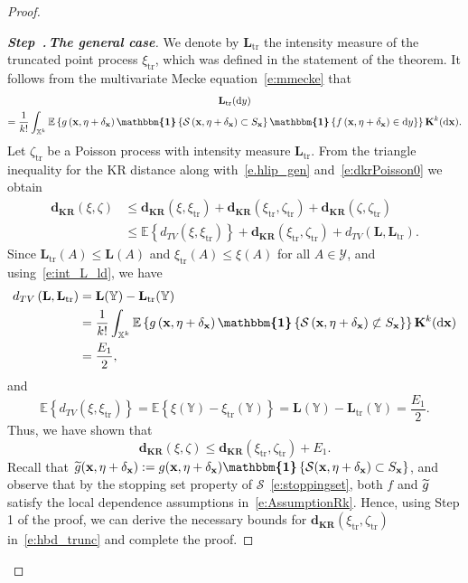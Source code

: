 \documentclass[10pt]{amsart}
\theoremstyle{definition}\newtheorem{defi}[theo]{Definition}\newtheorem{rema}[theo]{Remark}\newtheorem{exam}[theo]{Example}\newtheorem{exem}[theo]{Example}\newtheorem{nota}[theo]{Notation}
\newcommand*\bL{\mathbf{L}}
\newcommand*\bK{\mathbf{K}}
\newcommand{\bx}{\mathbf{x}}
\newcommand*\dkr{\mathbf{d_{KR}}}
\newcommand*\X{\mathbb{X}}
\newcommand*\Y{\mathbb{Y}}
\newcommand{\E}{\mathbb{E}}
\newcommand*\cS{\mathcal{S}}
\newcommand*\cY{\mathcal{Y}}
\newcommand{\tr}{\mathrm{tr}}
\newcommand*\md{\mathrm{d}}
\newcommand{\mean}[1] {\E\left\{{#1}\right\}}
\newcommand{\ind}{\boldsymbol{\mathbbm{1}}}
\newcommand{\set}[1]{\left\{#1\right\}}
\newcommand{\tg}{\tilde{g}}
\newcounter{stepcount}
\newenvironment{step}[1]{\refstepcounter{stepcount}\begin{proof}[\emph{\textbf{Step~\thestepcount.\,}{\textbf{#1}}}]}
{\let\qed\relax\end{proof}}
\let\oldtilde\tilde
\renewcommand*{\tilde}[1]{\mathchoice{\widetilde{#1}}{\widetilde{#1}}{\oldtilde{#1}}{\oldtilde{#1}}}
\begin{document}
\begin{proof}
\begin{step}{{The general case}}
We denote by $\bL_{\tr}$ the intensity measure of the truncated point process $\xi_{\tr}$, which was defined in the statement of the theorem. It follows from the multivariate Mecke equation~\eqref{e:mmecke} that
\begin{multline*}
\bL_{\tr}(\md y) \\
= \frac{1}{k!}\int_{\X^k} \mean{g\left(\bx,\eta+\delta_{\bx}\right) \ind\set{\cS\left(\bx,\eta+\delta_{\bx}\right) \subset S_{\bx}} \ind\set{f\left(\bx,\eta+\delta_{\bx}\right)\in \md y}} \bK^k(\md\bx).
\end{multline*}
Let $\zeta_{\tr}$ be a Poisson process with intensity measure $\bL_{\tr}$. From the triangle inequality for the KR distance along with~\eqref{e.hlip_gen} and~\eqref{e:dkrPoisson0} we obtain
\begin{align*}
\dkr(\xi,\zeta) & \leq \dkr\left(\xi,\xi_{\tr}\right) + \dkr\left(\xi_{\tr},\zeta_{\tr}\right) + \dkr\left(\zeta,\zeta_{\tr}\right) \\
& \leq \mean{d_{TV}\left(\xi,\xi_{\tr}\right)} + \dkr\left(\xi_{\tr},\zeta_{\tr}\right) + d_{TV}\left(\bL,\bL_{\tr}\right) \nonumber.
\end{align*}
Since $\bL_{\tr}(A) \leq \bL(A)$ and $\xi_{\tr}(A) \leq \xi(A)$ for all $A\in\cY$, and using~\eqref{e:int_L_ld}, we have
\begin{align*}
d_{TV}\left(\bL,\bL_{\tr}\right) &= \bL(\Y) - \bL_{\tr}(\Y)\\
 &= \frac{1}{k!}\int_{\X^k} \mean{g\left(\bx,\eta+\delta_{\bx}\right) \ind\set{\cS\left(\bx,\eta+\delta_{\bx}\right) \not\subset S_{\bx}}} \bK^k(\md\bx) \\
&= \frac{E_1}{2},
\end{align*}
and
\[
\mean{d_{TV}\left(\xi,\xi_{\tr}\right)} = \mean{ \xi(\Y) - \xi_{\tr}(\Y) } = \bL(\Y) - \bL_{\tr}(\Y) = \frac{E_1}{2}.
\]
Thus, we have shown that
\begin{equation}\label{e:hbd_trunc}
\dkr(\xi,\zeta) \leq \dkr\left(\xi_{\tr},\zeta_{\tr}\right) + E_1.
\end{equation}
Recall that $\tg(\bx,\eta+\delta_{\bx}) := g(\bx,\eta+\delta_{\bx})\ind\set{\cS(\bx,\eta+\delta_{\bx}) \subset S_{\bx}}$, and observe that by the stopping set property of $\cS$~\eqref{e:stoppingset}, both $f$ and $\tg$ satisfy the local dependence assumptions in~\eqref{e:AssumptionRk}. Hence, using Step 1 of the proof, we can derive the necessary bounds for $\dkr(\xi_{\tr},\zeta_{\tr})$ in~\eqref{e:hbd_trunc} and complete the proof.\qedhere
\end{step}\let\qed\relax
\end{proof}
\end{document}
